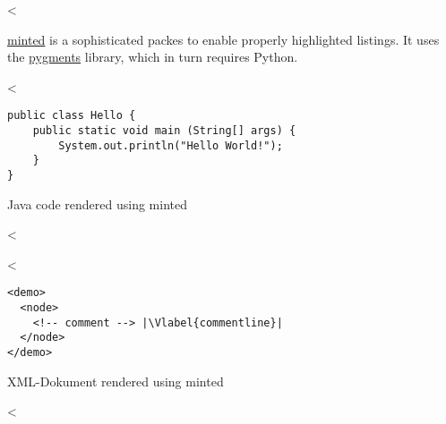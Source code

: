 <%

\href{https://github.com/gpoore/minted}{minted} is a sophisticated packes to enable properly highlighted listings.
It uses the \href{http://pygments.org/}{pygments} library, which in turn requires Python.

<%
\begin{listing}[htbp]
    \begin{verbatim}
public class Hello {
    public static void main (String[] args) {
        System.out.println("Hello World!");
    }
}
  \end{verbatim}
  \caption{Java code rendered using minted}
  \label{lst:java}
\end{listing}
<%

<%
\begin{listing}[htbp]
  \begin{verbatim}
<demo>
  <node>
    <!-- comment --> |\Vlabel{commentline}|
  </node>
</demo>
  \end{verbatim}
  \caption{XML-Dokument rendered using minted}
  \label{lst:xml}
\end{listing}
<%
